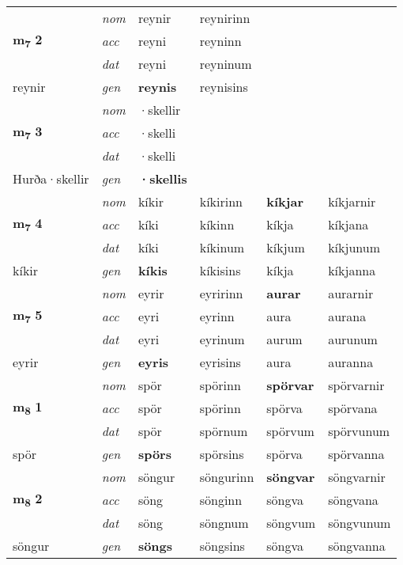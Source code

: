 \begin{longtable}[l]{X>{\footnotesize\itshape}XXXXX}
\multirow{3}{*}{{{\textbf{m{\textsubscript{7}}} \Large{\textbf{2}}}}} & nom & reynir & reynirinn & \textbf{} &  \\*
 & acc & reyni & reyninn &  &  \\*
 & dat & reyni & reyninum &  &  \\*
 {\footnotesize{reynir}} & gen & \textbf{reynis} & reynisins &  &  \\
\midrule

\multirow{3}{*}{{{\textbf{m{\textsubscript{7}}} \Large{\textbf{3}}}}} & nom & ·skellir &  & \textbf{} &  \\*
 & acc & ·skelli &  &  &  \\*
 & dat & ·skelli &  &  &  \\*
 {\footnotesize{Hurða\allowbreak ·skellir}} & gen & \textbf{·skellis} &  &  &  \\
\midrule

\multirow{3}{*}{{{\textbf{m{\textsubscript{7}}} \Large{\textbf{4}}}}} & nom & kíkir & kíkirinn & \textbf{kíkjar} & kíkjarnir \\*
 & acc & kíki & kíkinn & kíkja & kíkjana \\*
 & dat & kíki & kíkinum & kíkjum & kíkjunum \\*
 {\footnotesize{kíkir}} & gen & \textbf{kíkis} & kíkisins & kíkja & kíkjanna \\
\midrule

\multirow{3}{*}{{{\textbf{m{\textsubscript{7}}} \Large{\textbf{5}}}}} & nom & eyrir & eyririnn & \textbf{aurar} & aurarnir \\*
 & acc & eyri & eyrinn & aura & aurana \\*
 & dat & eyri & eyrinum & aurum & aurunum \\*
 {\footnotesize{eyrir}} & gen & \textbf{eyris} & eyrisins & aura & auranna \\
\midrule

\multirow{3}{*}{{{\textbf{m{\textsubscript{8}}} \Large{\textbf{1}}}}} & nom & spör & spörinn & \textbf{spörvar} & spörvarnir \\*
 & acc & spör & spörinn & spörva & spörvana \\*
 & dat & spör & spörnum & spörvum & spörvunum \\*
 {\footnotesize{spör}} & gen & \textbf{spörs} & spörsins & spörva & spörvanna \\
\midrule

\multirow{3}{*}{{{\textbf{m{\textsubscript{8}}} \Large{\textbf{2}}}}} & nom & söngur & söngurinn & \textbf{söngvar} & söngvarnir \\*
 & acc & söng & sönginn & söngva & söngvana \\*
 & dat & söng & söngnum & söngvum & söngvunum \\*
 {\footnotesize{söngur}} & gen & \textbf{söngs} & söngsins & söngva & söngvanna \\
\midrule


\end{longtable}
